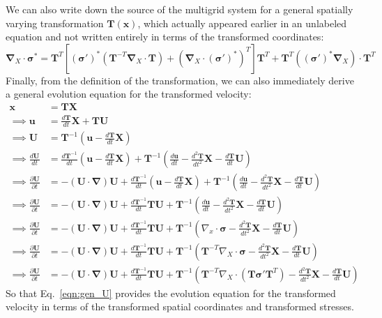 \documentclass[11pt]{article}
\newcommand{\p}{\partial}
\newcommand{\bsig}{\boldsymbol\sigma}
\newcommand{\bT}{\mathbf{T}}
\newcommand{\bU}{\mathbf{U}}
\newcommand{\bX}{\mathbf{X}}
\newcommand{\bx}{\mathbf{x}}
\newcommand{\bu}{\mathbf{u}}
\newcommand{\bgrad}{\boldsymbol{\nabla}}
\newcommand{\adv}{\left(\bU\cdot\bgrad\right)}
\begin{document}
We can also write down the source of the multigrid system for a general spatially varying transformation $\bT(\bx)$, which actually appeared earlier in an unlabeled equation and not written entirely in terms of the transformed coordinates:
\begin{equation}
    \bgrad_X\cdot\bsig^* = \bT^{T}\left[\left( \bsig' \right)^*\left(\bT^{-T}\bgrad_X\cdot \bT\right) + \left(\bgrad_X\cdot\left( \bsig' \right)^*\right)^T\right]\bT^T + \bT^T\left(\left( \bsig' \right)^*\bgrad_X\right)\cdot\bT^T
    \label{eqn:mg_source_gen}
\end{equation}
Finally, from the definition of the transformation, we can also immediately derive a general evolution equation for the transformed velocity:
\begin{align}
    \bx &= \bT \bX\nonumber\\
    \implies \bu &= \frac{d\bT}{dt}\bX + \bT \bU\nonumber\\
    \implies \bU &= \bT^{-1}\left(\bu - \frac{d\bT}{dt}\bX\right)\nonumber\\
    \implies \frac{d \bU}{dt} &= \frac{d \bT^{-1}}{dt}\left(\bu - \frac{d \bT}{dt}\bX\right) + \bT^{-1}\left(\frac{d\bu}{dt} - \frac{d^2\bT}{d t^2}\bX - \frac{d\bT}{d t}\bU\right)\nonumber\\
    \implies \frac{\p \bU}{\p t} &= -\adv \bU + \frac{d \bT^{-1}}{dt}\left(\bu - \frac{d \bT}{dt}\bX\right) + \bT^{-1}\left(\frac{d\bu}{dt} - \frac{d^2\bT}{d t^2}\bX - \frac{d\bT}{d t}\bU\right)\nonumber \\
    \implies \frac{\p \bU}{\p t} &= -\adv \bU + \frac{d \bT^{-1}}{dt}\bT\bU + \bT^{-1}\left(\frac{d\bu}{dt} - \frac{d^2\bT}{d t^2}\bX - \frac{d\bT}{d t}\bU\right)\nonumber\\
    \implies \frac{\p \bU}{\p t} &= -\adv \bU + \frac{d \bT^{-1}}{dt}\bT\bU + \bT^{-1}\left(\nabla_x\cdot\bsig - \frac{d^2\bT}{d t^2}\bX - \frac{d\bT}{d t}\bU\right)\nonumber\\
    \implies \frac{\p \bU}{\p t} &= -\adv \bU + \frac{d \bT^{-1}}{dt}\bT\bU + \bT^{-1}\left(\bT^{-T}\nabla_X\cdot\bsig - \frac{d^2\bT}{d t^2}\bX - \frac{d\bT}{d t}\bU\right)\nonumber\\
    \implies \frac{\p \bU}{\p t} &= -\adv \bU + \frac{d \bT^{-1}}{dt}\bT\bU + \bT^{-1}\left(\bT^{-T}\nabla_X\cdot\left(\bT \bsig' \bT^{T}\right) - \frac{d^2\bT}{d t^2}\bX - \frac{d\bT}{d t}\bU\right)
\label{eqn:gen_U}
\end{align}
So that Eq.~\ref{eqn:gen_U} provides the evolution equation for the transformed velocity in terms of the transformed spatial coordinates and transformed stresses.
\end{document}
